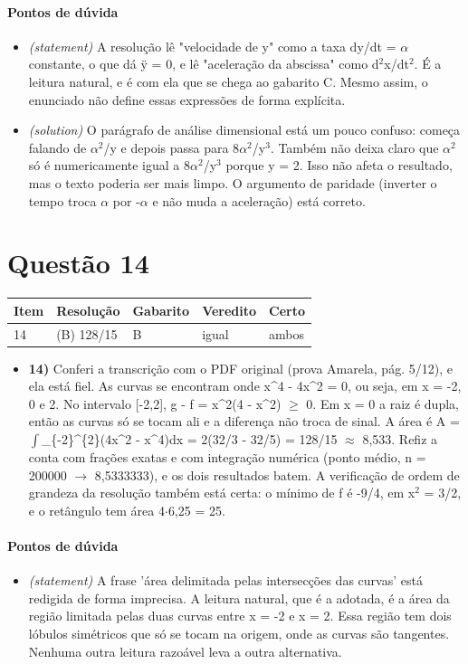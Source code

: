 \documentclass{article}%
\begin{document}
\paragraph{Pontos de dúvida}%
\begin{itemize}%
\item%
\textit{(statement)} A resolução lê "velocidade de y" como a taxa dy/dt = $\alpha$ constante, o que dá ÿ = 0, e lê "aceleração da abscissa" como d$^2$x/dt$^2$. É a leitura natural, e é com ela que se chega ao gabarito C. Mesmo assim, o enunciado não define essas expressões de forma explícita.%
\item%
\textit{(solution)} O parágrafo de análise dimensional está um pouco confuso: começa falando de $\alpha$$^2$/y e depois passa para 8$\alpha$$^2$/y$^3$. Também não deixa claro que $\alpha$$^2$ só é numericamente igual a 8$\alpha$$^2$/y$^3$ porque y = 2. Isso não afeta o resultado, mas o texto poderia ser mais limpo. O argumento de paridade (inverter o tempo troca $\alpha$ por -$\alpha$ e não muda a aceleração) está correto.%
\end{itemize}%
\section*{Questão 14}%
\begin{longtable}{@{}p{} p{} p{} p{} p{}@{}}\toprule Item & Resolução & Gabarito & Veredito & Certo \\ \midrule
14 & (B) 128/15 & B & igual & ambos \\
\bottomrule\end{longtable}%
\begin{itemize}%
\item%
\textbf{14)} Conferi a transcrição com o PDF original (prova Amarela, pág. 5/12), e ela está fiel. As curvas se encontram onde x\^{}4 {-} 4x\^{}2 = 0, ou seja, em x = {-}2, 0 e 2. No intervalo {[}{-}2,2{]}, g {-} f = x\^{}2(4 {-} x\^{}2) $\geq$ 0. Em x = 0 a raiz é dupla, então as curvas só se tocam ali e a diferença não troca de sinal. A área é A = $\int$\_\{{-}2\}\^{}\{2\}(4x\^{}2 {-} x\^{}4)dx = 2(32/3 {-} 32/5) = 128/15 $\approx$ 8,533. Refiz a conta com frações exatas e com integração numérica (ponto médio, n = 200000 $\to$ 8,5333333), e os dois resultados batem. A verificação de ordem de grandeza da resolução também está certa: o mínimo de f é {-}9/4, em x$^2$ = 3/2, e o retângulo tem área 4$\cdot$6,25 = 25.%
\end{itemize}%
\paragraph{Pontos de dúvida}%
\begin{itemize}%
\item%
\textit{(statement)} A frase 'área delimitada pelas intersecções das curvas' está redigida de forma imprecisa. A leitura natural, que é a adotada, é a área da região limitada pelas duas curvas entre x = {-}2 e x = 2. Essa região tem dois lóbulos simétricos que só se tocam na origem, onde as curvas são tangentes. Nenhuma outra leitura razoável leva a outra alternativa.%
\end{itemize}%
\end{document}
